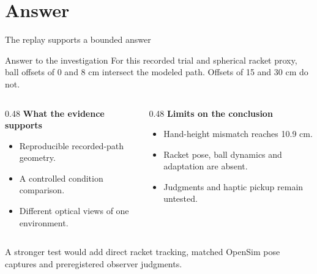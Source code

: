 \section{Answer}
\begin{frame}{The replay supports a bounded answer}
\begin{tbox}{Answer to the investigation}
For this recorded trial and spherical racket proxy, ball offsets of 0 and 8 cm intersect the modeled path. Offsets of 15 and 30 cm do not.
\end{tbox}
\par\bigskip
\begin{columns}[T,onlytextwidth]
\begin{column}{0.48\textwidth}
\textbf{What the evidence supports}
\begin{itemize}\small
\item Reproducible recorded-path geometry.
\item A controlled condition comparison.
\item Different optical views of one environment.
\end{itemize}
\end{column}
\begin{column}{0.48\textwidth}
\textbf{Limits on the conclusion}
\begin{itemize}\small
\item Hand-height mismatch reaches 10.9 cm.
\item Racket pose, ball dynamics and adaptation are absent.
\item Judgments and haptic pickup remain untested.
\end{itemize}
\end{column}
\end{columns}
\par\medskip
{\small A stronger test would add direct racket tracking, matched OpenSim pose captures and preregistered observer judgments.}
\end{frame}

